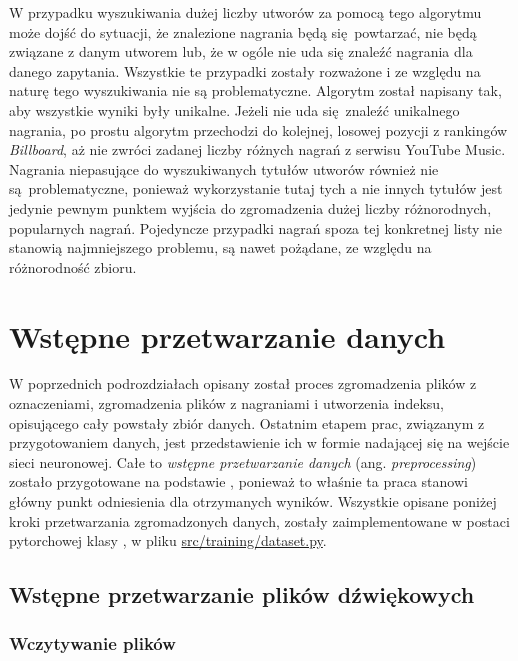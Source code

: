 W przypadku wyszukiwania dużej liczby utworów za pomocą tego algorytmu może dojść do sytuacji, że
znalezione nagrania będą się powtarzać, nie będą związane z danym utworem lub, że w ogóle nie uda
się znaleźć nagrania dla danego zapytania. Wszystkie te przypadki zostały rozważone i ze względu na
naturę tego wyszukiwania nie są problematyczne. Algorytm został napisany tak, aby wszystkie wyniki
były unikalne. Jeżeli nie uda się znaleźć unikalnego nagrania, po prostu algorytm przechodzi do
kolejnej, losowej pozycji z rankingów \emph{Billboard}, aż nie zwróci zadanej liczby różnych nagrań
z serwisu YouTube Music. Nagrania niepasujące do wyszukiwanych tytułów utworów również nie
są problematyczne, ponieważ wykorzystanie tutaj tych a nie innych tytułów jest jedynie pewnym
punktem wyjścia do zgromadzenia dużej liczby różnorodnych, popularnych nagrań. Pojedyncze przypadki
nagrań spoza tej konkretnej listy nie stanowią najmniejszego problemu, są nawet pożądane, ze względu
na różnorodność zbioru.

\section{Wstępne przetwarzanie danych} \label{sec:preprocessing}

W poprzednich podrozdziałach opisany został proces zgromadzenia plików z oznaczeniami, zgromadzenia
plików z nagraniami i utworzenia indeksu, opisującego cały powstały zbiór danych. Ostatnim etapem
prac, związanym z przygotowaniem danych, jest przedstawienie ich w formie nadającej się na wejście
sieci neuronowej. Całe to \emph{wstępne przetwarzanie danych} (ang. \emph{preprocessing}) zostało
przygotowane na podstawie \cite{park_bi-directional_2019}, ponieważ to właśnie ta praca stanowi
główny punkt odniesienia dla otrzymanych wyników. Wszystkie opisane poniżej kroki przetwarzania
zgromadzonych danych, zostały zaimplementowane w postaci pytorchowej klasy , w pliku
\url{src/training/dataset.py}.

\subsection{Wstępne przetwarzanie plików dźwiękowych}

\subsubsection{Wczytywanie plików}

